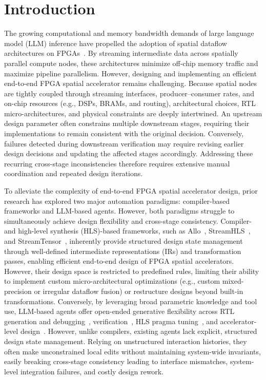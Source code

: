 \documentclass[9pt,conference]{IEEEtran}
\begin{document}
\section{Introduction}
The growing computational and memory bandwidth demands of large language model (LLM) inference have propelled the adoption of spatial dataflow architectures on FPGAs~\cite{streamtensor}. By streaming intermediate data across spatially parallel compute nodes, these architectures minimize off-chip memory traffic and maximize pipeline parallelism. However, designing and implementing an efficient end-to-end FPGA spatial accelerator remains challenging. Because spatial nodes are tightly coupled through streaming interfaces, producer–consumer rates, and on-chip resources (e.g., DSPs, BRAMs, and routing), architectural choices, RTL micro-architectures, and physical constraints are deeply intertwined. An upstream design parameter often constrains multiple downstream stages, requiring their implementations to remain consistent with the original decision. Conversely, failures detected during downstream verification may require revising earlier design decisions and updating the affected stages accordingly. Addressing these recurring cross-stage inconsistencies therefore requires extensive manual coordination and repeated design iterations.

To alleviate the complexity of end-to-end FPGA spatial accelerator design, prior research has explored two major automation paradigms: compiler-based frameworks and LLM-based agents. However, both paradigms struggle to simultaneously achieve design flexibility and cross-stage consistency. Compiler- and high-level synthesis (HLS)-based frameworks, such as Allo~\cite{allo}, StreamHLS~\cite{streamhls}, and StreamTensor~\cite{streamtensor}, inherently provide structured design state management through well-defined intermediate representations (IRs) and transformation passes, enabling efficient end-to-end design of FPGA spatial accelerators. However, their design space is restricted to predefined rules, limiting their ability to implement custom micro-architectural optimizations (e.g., custom mixed-precision or irregular dataflow fusion) or restructure designs beyond built-in transformations. Conversely, by leveraging broad parametric knowledge and tool use, LLM-based agents offer open-ended generative flexibility across RTL generation and debugging~\cite{mage,rtlfixer}, verification~\cite{assertllm,correctbench}, HLS pragma tuning~\cite{hlspilot}, and accelerator-level design~\cite{mahl,gpt4aigchip,designconductor2}. However, unlike compilers, existing agents lack explicit, structured design state management. Relying on unstructured interaction histories, they often make unconstrained local edits without maintaining system-wide invariants, easily breaking cross-stage consistency leading to interface mismatches, system-level integration failures, and costly design rework.
\end{document}
